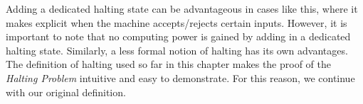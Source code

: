 \documentclass[../../../include/open-logic-section]{subfiles}
\begin{document}
\begin{explain}
Adding a dedicated halting state can be advantageous in cases like this,
where it makes explicit when the machine accepts/rejects certain inputs.
However, it is important to note that no computing power is gained by
adding in a dedicated halting state. Similarly, a less formal notion of halting
 has its own advantages. The definition of halting used so far in this chapter
 makes the proof of the \emph{Halting Problem} intuitive and easy
to demonstrate. For this reason, we continue with our original definition.
\end{explain}
\end{document}
